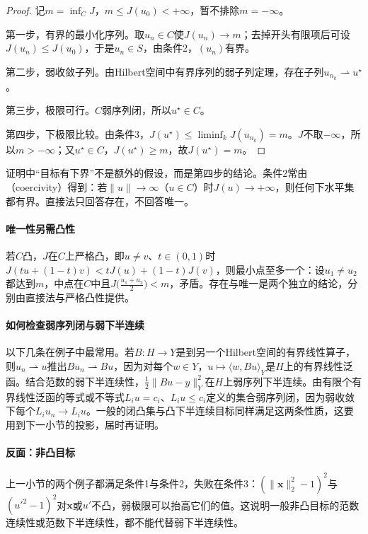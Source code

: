 \begin{proof}
记$m=\inf_CJ$，$m\le J(u_0)<+\infty$，暂不排除$m=-\infty$。

第一步，有界的最小化序列。取$u_n\in C$使$J(u_n)\to m$；去掉开头有限项后可设$J(u_n)\le J(u_0)$，于是$u_n\in S$，由条件2，$(u_n)$有界。

第二步，弱收敛子列。由Hilbert空间中有界序列的弱子列定理，存在子列$u_{n_k}\rightharpoonup u^\star$。

第三步，极限可行。$C$弱序列闭，所以$u^\star\in C$。

第四步，下极限比较。由条件3，$J(u^\star)\le\liminf_kJ(u_{n_k})=m$。$J$不取$-\infty$，所以$m>-\infty$；又$u^\star\in C$，$J(u^\star)\ge m$，故$J(u^\star)=m$。
\end{proof}

证明中“目标有下界”不是额外的假设，而是第四步的结论。条件2常由（coercivity）得到：若$\|u\|\to\infty$（$u\in C$）时$J(u)\to+\infty$，则任何下水平集都有界。直接法只回答存在，不回答唯一。

\paragraph{唯一性另需凸性}
若$C$凸，$J$在$C$上严格凸，即$u\neq v$、$t\in(0,1)$时$J(tu+(1-t)v)<tJ(u)+(1-t)J(v)$，则最小点至多一个：设$u_1\neq u_2$都达到$m$，中点在$C$中且$J\bigl(\frac{u_1+u_2}2\bigr)<m$，矛盾。存在与唯一是两个独立的结论，分别由直接法与严格凸性提供。

\paragraph{如何检查弱序列闭与弱下半连续}
以下几条在例子中最常用。若$B:H\to Y$是到另一个Hilbert空间的有界线性算子，则$u_n\rightharpoonup u$推出$Bu_n\rightharpoonup Bu$，因为对每个$w\in Y$，$u\mapsto\langle w,Bu\rangle_Y$是$H$上的有界线性泛函。结合范数的弱下半连续性，$\frac12\|Bu-y\|_Y^2$在$H$上弱序列下半连续。由有限个有界线性泛函的等式或不等式$L_iu=c_i$、$L_iu\le c_i$定义的集合弱序列闭，因为弱收敛下每个$L_iu_n\to L_iu$。一般的闭凸集与凸下半连续目标同样满足这两条性质，这要用到下一小节的投影，届时再证明。

\paragraph{反面：非凸目标}
上一小节的两个例子都满足条件1与条件2，失败在条件3：$(\|\bm x\|_2^2-1)^2$与$(u'^2-1)^2$对$\bm x$或$u'$不凸，弱极限可以抬高它们的值。这说明一般非凸目标的范数连续性或范数下半连续性，都不能代替弱下半连续性。

